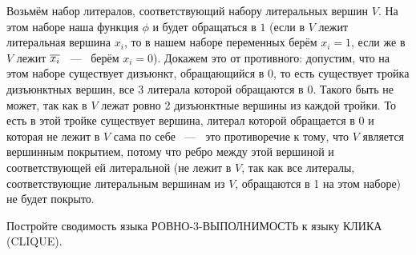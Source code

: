 \documentclass[a4paper,12pt]{article}
\begin{document}
\begin{solution}
\begin{itemize}
		 Возьмём набор литералов, соответствующий набору литеральных вершин $V$. На этом наборе наша функция $\phi$ и будет обращаться в $1$ (если в $V$ лежит литеральная вершина $x_i$, то в нашем наборе переменных берём $x_i = 1$, если же в $V$ лежит $\overline{x_i}$ ~---~ берём $x_i = 0$). Докажем это от противного: допустим, что на этом наборе существует дизъюнкт, обращающийся в $0$, то есть существует тройка дизъюнктных вершин, все 3 литерала которой обращаются в $0$. Такого быть не может, так как в $V$ лежат ровно 2 дизъюнктные вершины из каждой тройки. То есть в этой тройке существует вершина, литерал которой обращается в 0 и которая не лежит в $V$ сама по себе ~---~ это противоречие к тому, что $V$ является вершинным покрытием, потому что ребро между этой вершиной и соответствующей ей литеральной (не лежит в $V$, так как все литералы, соответствующие литеральным вершинам из $V$, обращаются в 1 на этом наборе) не будет покрыто.
		  
	\end{itemize}
	
\end{solution}

\begin{tasknum}{4}
	Постройте сводимость языка РОВНО-3-ВЫПОЛНИМОСТЬ к языку КЛИКА (CLIQUE).
\end{tasknum}
\end{document}
